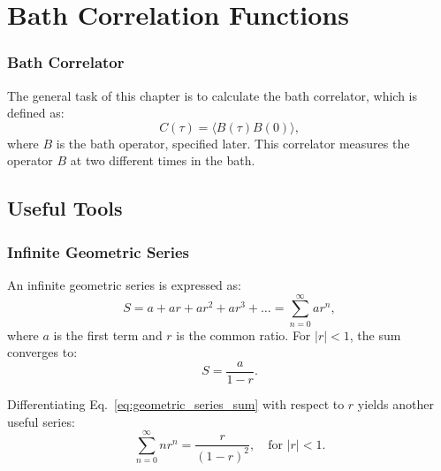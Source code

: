 
\chapter{Bath Correlation Functions} %

\label{Chapter_calc_extra_stuff} %


\subsection{Bath Correlator}
\label{subsec:bath_correlator}

The general task of this chapter is to calculate the bath correlator, which is defined as:
\begin{equation} \label{eq:bath_correlator}
	C(\tau) = \langle B(\tau) B(0) \rangle,
\end{equation}
where \( B \) is the bath operator, specified later. This correlator measures the operator \( B \) at two different times in the bath.

\section{Useful Tools}

\subsection{Infinite Geometric Series}
An infinite geometric series is expressed as:
\begin{equation} \label{eq:infinite_geometric_series}
	S = a + ar + ar^2 + ar^3 + \dots = \sum_{n=0}^{\infty} ar^n,
\end{equation}
where \(a\) is the first term and \(r\) is the common ratio. For \(|r| < 1\), the sum converges to:
\begin{equation} \label{eq:geometric_series_sum}
	S = \frac{a}{1 - r}.
\end{equation}

Differentiating Eq.~\eqref{eq:geometric_series_sum} with respect to \( r \) yields another useful series:
\begin{equation} \label{eq:derivation_geometric_sum}
	\sum_{n=0}^{\infty} n r^n = \frac{r}{(1-r)^2}, \quad \text{for } |r| < 1.
\end{equation}

